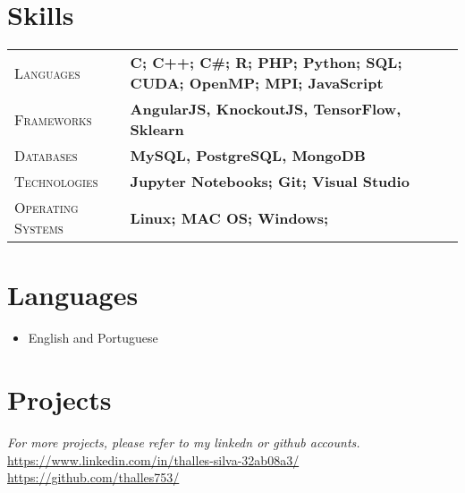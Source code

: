 \documentclass[10pt, a4paper, oneside, final]{scrartcl} %
\newcommand{\gray}{\rowcolor[gray]{.90}} %
\begin{document}

\section{Skills}

\begin{tabularx}{1.0\linewidth}{>{\raggedleft\scshape}p{3.6cm}X}
\gray Languages & \textbf{C; C++; C\#; R; PHP; Python; SQL; CUDA; OpenMP; MPI; JavaScript}\\
\gray Frameworks & \textbf{AngularJS, KnockoutJS, TensorFlow, Sklearn}\\
\gray Databases & \textbf{MySQL, PostgreSQL, MongoDB}\\
\gray Technologies & \textbf{Jupyter Notebooks; Git; Visual Studio}\\
\gray Operating Systems & \textbf{Linux; MAC OS; Windows;}\\
\end{tabularx}



\section{Languages}

\begin{itemize} \itemsep1.5pt \parskip0pt 
  \item English and Portuguese 
\end{itemize}



\section{Projects}

\textit{For more projects, please refer to my linkedn or github accounts.}\\
\url{https://www.linkedin.com/in/thalles-silva-32ab08a3/}\\
\url{https://github.com/thalles753/}
\end{document}
